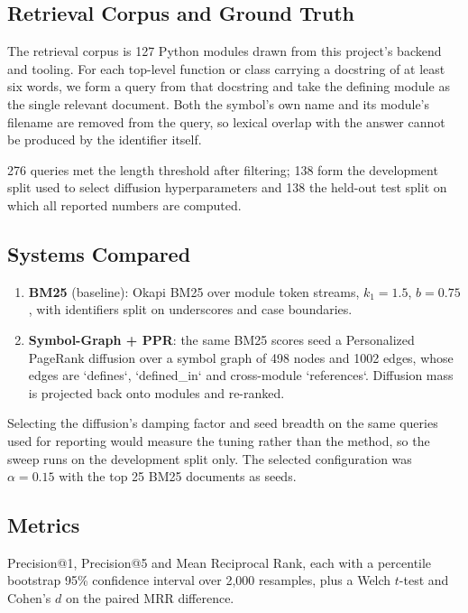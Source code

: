 \documentclass[10pt,journal,compsoc,twocolumn]{IEEEtran}
\begin{document}
\subsection{Retrieval Corpus and Ground Truth}


The retrieval corpus is 127 Python modules drawn from this project's backend and tooling. For each top-level function or class carrying a docstring of at least six words, we form a query from that docstring and take the defining module as the single relevant document. Both the symbol's own name and its module's filename are removed from the query, so lexical overlap with the answer cannot be produced by the identifier itself.

276 queries met the length threshold after filtering; 138 form the development split used to select diffusion hyperparameters and 138 the held-out test split on which all reported numbers are computed.


\subsection{Systems Compared}


\begin{enumerate}
  \item \textbf{BM25} (baseline): Okapi BM25 over module token streams, $k_1 = 1.5$, $b = 0.75$, with identifiers split on underscores and case boundaries.
  \item \textbf{Symbol-Graph + PPR}: the same BM25 scores seed a Personalized PageRank diffusion over a symbol graph of 498 nodes and 1002 edges, whose edges are `defines`, `defined\_in` and cross-module `references`. Diffusion mass is projected back onto modules and re-ranked.
\end{enumerate}

Selecting the diffusion's damping factor and seed breadth on the same queries used for reporting would measure the tuning rather than the method, so the sweep runs on the development split only. The selected configuration was $\alpha = 0.15$ with the top 25 BM25 documents as seeds.


\subsection{Metrics}


Precision@1, Precision@5 and Mean Reciprocal Rank, each with a percentile bootstrap 95\% confidence interval over 2,000 resamples, plus a Welch $t$-test and Cohen's $d$ on the paired MRR difference.
\end{document}
